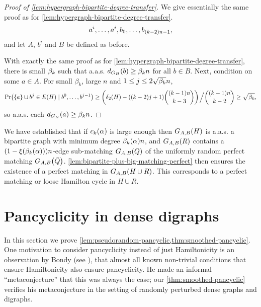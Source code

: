 \documentclass[11pt,english]{article}
\theoremstyle{plain}
\theoremstyle{definition}
\theoremstyle{definition}
\theoremstyle{plain}
\theoremstyle{plain}
\theoremstyle{plain}
\theoremstyle{plain}
\theoremstyle{remark}
\theoremstyle{remark}
\let\originalleft\left
\let\originalright\right
\renewcommand{\left}{\mathopen{}\mathclose\bgroup\originalleft}
\renewcommand{\right}{\aftergroup\egroup\originalright}
\begin{document}
\begin{proof}
[Proof of \ref{lem:hypergraph-bipartite-degree-transfer}]We give
essentially the same proof as for \ref{lem:hypergraph-bipartite-degree-transfer}.
\[
a^{i},\dots,a^{i},b_{0},\dots,b_{\left(k-2\right)n-1},
\]
and let $A$, $b^i$ and $B$ be defined as before.

With exactly the same proof as for \ref{lem:hypergraph-bipartite-degree-transfer},
there is small $\beta_k$ such that a.a.s. $d_{G_{H}}\left(b\right)\ge\aham n$
for all $b\in B$. Next, condition on some $a\in A$. For small $\beta_k$, large $n$
and $1\le j\le2\sqrt{\beta_k}n$,
\[
\Pr\left(\left\{ a\right\} \cup b^{j}\in E\left(H\right)\mid b^{0},\dots,b^{j-1}\right)\ge\left(\delta_{2}\left(H\right)-\left(\left(k-2\right)j+1\right){\left(k-1\right)n \choose k-3}\right)\left.\vphantom{\sum}\right/{ \left(k-1\right)n \choose k-2}\ge\sqrt{\aham},
\]
so a.a.s. each $d_{G_{H}}\left(a\right)\ge\aham n$.
\end{proof}
We have established that if $\chyp\left(\alpha\right)$ 
is large enough then $G_{A,B}\left(H\right)$ is a.a.s. a bipartite graph with minimum degree $\a\left(\alpha\right)n$, and $G_{A,B}\left(R\right)$ contains a $\left(1-\xi\left(\a\left(\alpha\right)\right)\right)n$-edge sub-matching $G_{A,B}\left(Q\right)$ of the uniformly random perfect matching $G_{A,B}\left(\bar{Q}\right)$. \ref{lem:bipartite-plus-big-matching-perfect} then
ensures the existence of a perfect matching in $G_{A,B}\left(H\cup R\right)$. This corresponds to a perfect matching or loose Hamilton cycle in $H\cup R$.


\section{\label{sec:digraphs}Pancyclicity in dense digraphs}

In this section we prove \ref{lem:pseudorandom-pancyclic,thm:smoothed-pancyclic}. One motivation to consider pancyclicity instead of just Hamiltonicity is an observation by Bondy (see \cite{Bon75}),
that almost all known non-trivial conditions that ensure Hamiltonicity
also ensure pancyclicity. He made an informal ``metaconjecture''
that this was always the case; our \ref{thm:smoothed-pancyclic} verifies
his metaconjecture in the setting of randomly perturbed dense graphs
and digraphs.
\end{document}
